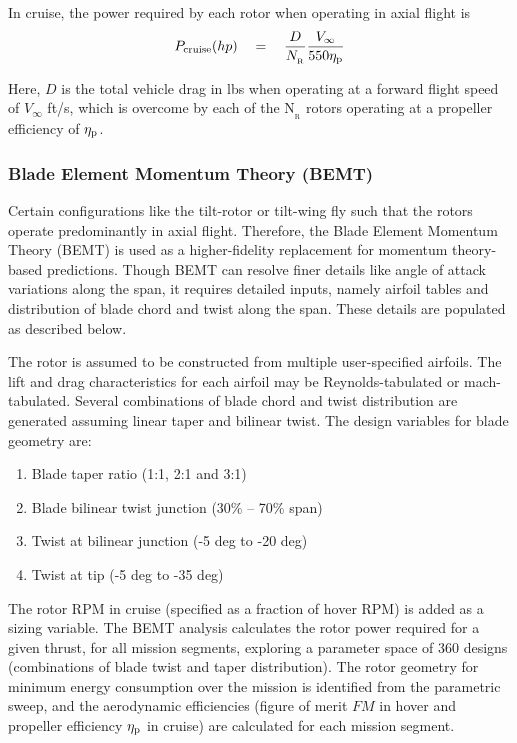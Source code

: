 In cruise, the power required by each rotor when operating in axial flight is 
\begin{equation}
P_{\rm cruise} (hp) \quad = \quad \frac{D}{N_{_\textrm{R}} } \frac{V_{\infty}}{550 \eta_{\rm p}}
\end{equation}

Here, $D$ is the total vehicle drag in lbs when operating at a forward flight speed of $V_{\infty}$ ft/s, which is overcome by each of the N$_{_\textrm{R}}$ rotors operating at a propeller efficiency of $\eta_{\rm p}$. 


\subsubsection{Blade Element Momentum Theory (BEMT)}
Certain configurations like the tilt-rotor or tilt-wing fly such that the rotors operate predominantly in axial flight. Therefore, the Blade Element Momentum Theory (BEMT) is used as a higher-fidelity replacement for momentum theory-based predictions. Though BEMT can resolve finer details like angle of attack variations along the span, it requires detailed inputs, namely airfoil tables and distribution of blade chord and twist along the span. These details are populated as described below.

The rotor is assumed to be constructed from multiple user-specified airfoils. The lift and drag characteristics for each airfoil may be Reynolds-tabulated or mach-tabulated. Several combinations of blade chord and twist distribution are generated assuming linear taper and bilinear twist. The design variables for blade geometry are:
\begin{enumerate}
\item Blade taper ratio (1:1, 2:1 and 3:1)
\item Blade bilinear twist junction (30\% -- 70\% span)
\item Twist at bilinear junction (-5 deg to -20 deg)
\item Twist at tip (-5 deg to -35 deg)
\end{enumerate}
The rotor RPM in cruise (specified as a fraction of hover RPM) is added as a sizing variable. The BEMT analysis calculates the rotor power required for a given thrust, for all mission segments, exploring a parameter space of 360 designs (combinations of blade twist and taper distribution). The rotor geometry for minimum energy consumption over the mission is identified from the parametric sweep, and the aerodynamic efficiencies (figure of merit $FM$ in hover and propeller efficiency $\eta_{\rm p}$ in cruise) are calculated for each mission segment. 

